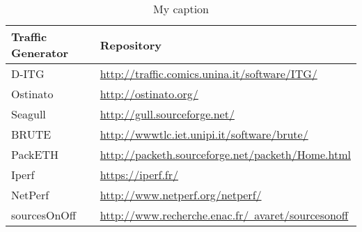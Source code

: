 \begin{table}[ht!]
\centering
\caption{My caption}
\label{my-label}
\begin{tabular}{@{}ll@{}}
\toprule
Traffic Generator       & Repository                                                                                                                                                                                                                \\ \midrule
D-ITG                   & \href{http://traffic.comics.unina.it/software/ITG/}{http://traffic.comics.unina.it/software/ITG/}                                                                                                                         \\
Ostinato                & \href{http://ostinato.org/}{http://ostinato.org/}                                                                                                                                                                         \\
Seagull                 & \href{http://gull.sourceforge.net/}{http://gull.sourceforge.net/}                                                                                                                                                         \\
BRUTE                   & \href{http://wwwtlc.iet.unipi.it/software/brute/ }{http://wwwtlc.iet.unipi.it/software/brute/ }                                                                                                                           \\
PackETH                 & \href{http://packeth.sourceforge.net/packeth/Home.html}{http://packeth.sourceforge.net/packeth/Home.html}                                                                                                                 \\
Iperf                   & \href{https://iperf.fr/}{https://iperf.fr/}                                                                                                                                                                               \\
NetPerf                 & \href{http://www.netperf.org/netperf/}{http://www.netperf.org/netperf/}                                                                                                                                                   \\
sourcesOnOff            & \href{http://www.recherche.enac.fr/~avaret/sourcesonoff}{http://www.recherche.enac.fr/~avaret/sourcesonoff}                                                                                                               \\

\end{tabular}
\end{table}
